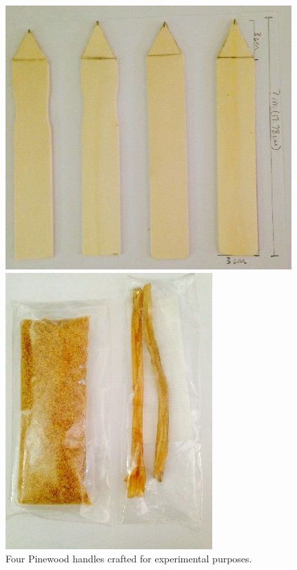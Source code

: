 \begin{figure}[!p]
	\centering
	\begin{minipage}{0.45\textwidth}
		\centering
		\includegraphics[width=1.15\linewidth]{figures/gagglioli_Fig2}
		\caption{Four Pinewood handles crafted for experimental purposes.}
		\label{fig:gagglioli_Fig2}
	\end{minipage}\hfill\noindent 
	\begin{minipage}{0.4\textwidth}
		\centering
		\includegraphics[width=\linewidth]{figures/gagglioli_Fig3}

\end{minipage}
\end{figure}
